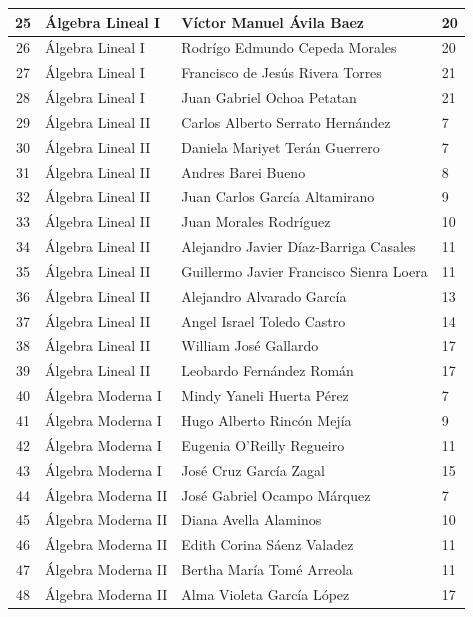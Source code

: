 {\begin{longtable}{|c|p{6.5cm}|p{5cm}|p{1.5cm}|}
25 & Álgebra Lineal I & Víctor Manuel Ávila Baez & 20 \\ \hline 
26 & Álgebra Lineal I & Rodrígo Edmundo Cepeda Morales & 20 \\ \hline 
27 & Álgebra Lineal I & Francisco de Jesús Rivera Torres & 21 \\ \hline 
28 & Álgebra Lineal I & Juan Gabriel Ochoa Petatan & 21 \\ \hline 
29 & Álgebra Lineal II & Carlos Alberto Serrato Hernández & 7 \\ \hline 
30 & Álgebra Lineal II & Daniela Mariyet Terán Guerrero & 7 \\ \hline 
31 & Álgebra Lineal II & Andres Barei Bueno & 8 \\ \hline 
32 & Álgebra Lineal II & Juan Carlos García Altamirano & 9 \\ \hline 
33 & Álgebra Lineal II & Juan Morales Rodríguez & 10 \\ \hline 
34 & Álgebra Lineal II & Alejandro Javier Díaz-Barriga Casales & 11 \\ \hline 
35 & Álgebra Lineal II & Guillermo Javier Francisco Sienra Loera & 11 \\ \hline 
36 & Álgebra Lineal II & Alejandro Alvarado García & 13 \\ \hline 
37 & Álgebra Lineal II & Angel Israel Toledo Castro & 14 \\ \hline 
38 & Álgebra Lineal II & William José Gallardo & 17 \\ \hline 
39 & Álgebra Lineal II & Leobardo Fernández Román & 17 \\ \hline 
40 & Álgebra Moderna I & Mindy Yaneli Huerta Pérez & 7 \\ \hline 
41 & Álgebra Moderna I & Hugo Alberto Rincón Mejía & 9 \\ \hline 
42 & Álgebra Moderna I & Eugenia O'Reilly Regueiro & 11 \\ \hline 
  43 & Álgebra Moderna I & José Cruz García Zagal & 15 \\ \hline 
  44 & Álgebra Moderna II & José Gabriel Ocampo Márquez & 7 \\ \hline 
  45 & Álgebra Moderna II & Diana Avella Alaminos & 10 \\ \hline 
  46 & Álgebra Moderna II & Edith Corina Sáenz Valadez & 11 \\ \hline 
  47 & Álgebra Moderna II & Bertha María Tomé Arreola & 11 \\ \hline 
  48 & Álgebra Moderna II & Alma Violeta García López & 17 \\ \hline 

\end{longtable}}

